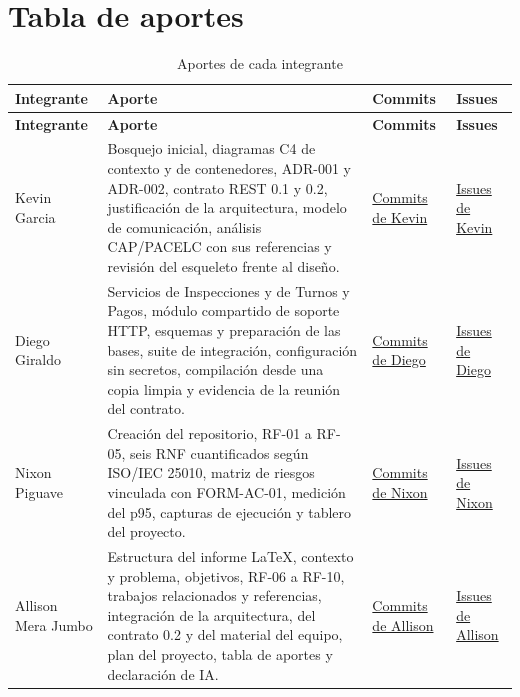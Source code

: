 \documentclass[11pt,a4paper]{article}
\begin{document}
	\section{Tabla de aportes}
	\begin{xltabular}{\textwidth}{L{3.3cm}XL{2.5cm}L{2.5cm}}
		\caption{Aportes de cada integrante}\label{tab:aportes}\\
		\toprule
		\textbf{Integrante} & \textbf{Aporte} & \textbf{Commits} & \textbf{Issues} \\
		\midrule
		\endfirsthead
		\toprule
		\textbf{Integrante} & \textbf{Aporte} & \textbf{Commits} & \textbf{Issues} \\
		\midrule
		\endhead
		\bottomrule
		\endfoot
		Kevin Garcia       & Bosquejo inicial, diagramas C4 de contexto y de contenedores, ADR-001 y ADR-002, contrato REST 0.1 y 0.2, justificación de la arquitectura, modelo de comunicación, análisis CAP/PACELC con sus referencias y revisión del esqueleto frente al diseño. & \href{https://github.com/NixonPiguave/TA-PFC-E1-PFC-Entrega-1/commits/main?author=yaser-uwu}{Commits de Kevin} & \href{https://github.com/NixonPiguave/TA-PFC-E1-PFC-Entrega-1/issues?q=assignee:yaser-uwu}{Issues de Kevin} \\
		Diego Giraldo      & Servicios de Inspecciones y de Turnos y Pagos, módulo compartido de soporte HTTP, esquemas y preparación de las bases, suite de integración, configuración sin secretos, compilación desde una copia limpia y evidencia de la reunión del contrato. & \href{https://github.com/NixonPiguave/TA-PFC-E1-PFC-Entrega-1/commits/main?author=dgiraldoc}{Commits de Diego} & \href{https://github.com/NixonPiguave/TA-PFC-E1-PFC-Entrega-1/issues?q=assignee:dgiraldoc}{Issues de Diego} \\
		Nixon Piguave      & Creación del repositorio, RF-01 a RF-05, seis RNF cuantificados según ISO/IEC 25010, matriz de riesgos vinculada con FORM-AC-01, medición del p95, capturas de ejecución y tablero del proyecto. & \href{https://github.com/NixonPiguave/TA-PFC-E1-PFC-Entrega-1/commits/main?author=NixonPiguave}{Commits de Nixon} & \href{https://github.com/NixonPiguave/TA-PFC-E1-PFC-Entrega-1/issues?q=assignee:NixonPiguave}{Issues de Nixon} \\
		Allison Mera Jumbo & Estructura del informe LaTeX, contexto y problema, objetivos, RF-06 a RF-10, trabajos relacionados y referencias, integración de la arquitectura, del contrato 0.2 y del material del equipo, plan del proyecto, tabla de aportes y declaración de IA. & \href{https://github.com/NixonPiguave/TA-PFC-E1-PFC-Entrega-1/commits/main?author=ameraj2-bit}{Commits de Allison} & \href{https://github.com/NixonPiguave/TA-PFC-E1-PFC-Entrega-1/issues?q=assignee:ameraj2-bit}{Issues de Allison} \\
	\end{xltabular}
	
\end{document}
